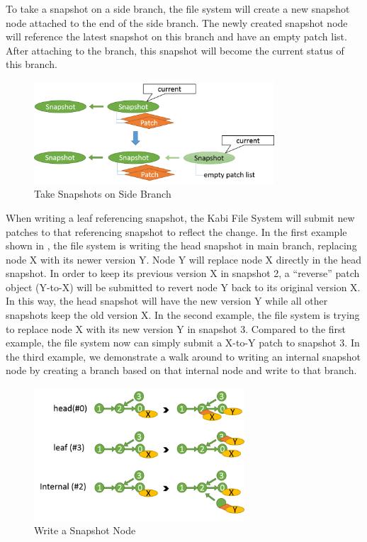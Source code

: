 	To take a snapshot on a side branch, the file system will create a new snapshot node attached to the end of the side branch. The newly created snapshot node will reference the latest snapshot on this branch and have an empty patch list. After attaching to the branch, this snapshot will become the current status of this branch.

\begin{figure}[hbtp]
\centering
\includegraphics[width=0.8\textwidth]{Chapter-4/figs/fig21.png}
\caption{Take Snapshots on Side Branch}
\label{fig:take_snapshot_nonroot}
\end{figure}
    
    When writing a leaf referencing snapshot, the Kabi File System will submit new patches to that referencing snapshot to reflect the change. In the first example shown in , the file system is writing the head snapshot in main branch, replacing node X with its newer version Y. Node Y will replace node X directly in the head snapshot. In order to keep its previous version X in snapshot 2, a ``reverse'' patch object (Y-to-X) will be submitted to revert node Y back to its original version X. In this way, the head snapshot will have the new version Y while all other snapshots keep the old version X. In the second example, the file system is trying to replace node X with its new version Y in snapshot 3. Compared to the first example, the file system now can simply submit a X-to-Y patch to snapshot 3. In the third example, we demonstrate a walk around to writing an internal snapshot node by creating a branch based on that internal node and write to that branch.

\begin{figure}[hbtp]
\centering
\includegraphics[width=0.7\textwidth]{Chapter-4/figs/fig17.png}
\caption{Write a Snapshot Node}
\label{fig:write_snapshot_node}
\end{figure}

